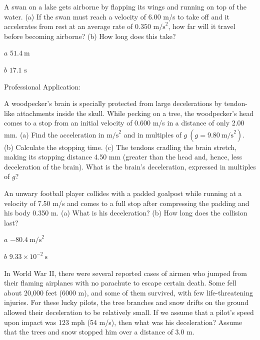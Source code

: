 \documentclass[
]{book}
\newenvironment{problems-exercises}{}{}
\newenvironment{tinysection}{}{}
\begin{document}
\begin{problems-exercises}
\hypertarget{fs-id1164906453058}{}
\leavevmode\hypertarget{fs-id1164906453061}{}%
A swan on a lake gets airborne by flapping its wings and running on top
of the water. (a) If the swan must reach a velocity of 6.00 m/s to take
off and it accelerates from rest at an average rate of
\({0\text{.}\text{350\ m/s}^{2}}{}\), how far will it travel before
becoming airborne? (b) How long does this take?

\leavevmode\hypertarget{fs-id1164906478379}{}%
\(a\) \({51\text{.}4\ \text{m}}{}\)

\(b\) \({\text{17}\text{.}\text{1\ s}}{}\)

\hypertarget{fs-id1164906459326}{}
\hypertarget{fs-id1164906459329}{}
\begin{tinysection}

{Professional Application:}

\end{tinysection}

A woodpecker's brain is specially protected from large decelerations by
tendon-like attachments inside the skull. While pecking on a tree, the
woodpecker's head comes to a stop from an initial velocity of 0.600 m/s
in a distance of only 2.00 mm. (a) Find the acceleration in
\(\text{m/s}^{2}{}\)\textsuperscript{} and in multiples of
\({g\ \left( {{g = 9}\text{.}\text{80}\ \text{m/s}^{2}} \right)}{}\). (b)
Calculate the stopping time. (c) The tendons cradling the brain stretch,
making its stopping distance 4.50 mm (greater than the head and, hence,
less deceleration of the brain). What is the brain's deceleration,
expressed in multiples of \(g\)?

\hypertarget{fs-id1164906466373}{}
\leavevmode\hypertarget{fs-id1164906466376}{}%
An unwary football player collides with a padded goalpost while running
at a velocity of 7.50 m/s and comes to a full stop after compressing the
padding and his body 0.350 m. (a) What is his deceleration? (b) How long
does the collision last?

\leavevmode\hypertarget{fs-id1164906466801}{}%
\(a\) \({{- \text{80}}\text{.}4\ \text{m/s}^{2}}{}\)

\(b\) \({9\text{.}{\text{33} \times \text{10}^{- 2}\ }\text{s}}{}\)

\hypertarget{fs-id1164906495926}{}
\leavevmode\hypertarget{fs-id1164906495929}{}%
In World War II, there were several reported cases of airmen who jumped
from their flaming airplanes with no parachute to escape certain death.
Some fell about 20,000 feet (6000 m), and some of them survived, with
few life-threatening injuries. For these lucky pilots, the tree branches
and snow drifts on the ground allowed their deceleration to be
relatively small. If we assume that a pilot's speed upon impact was 123
mph (54 m/s), then what was his deceleration? Assume that the trees and
snow stopped him over a distance of 3.0 m.


\end{problems-exercises}
\end{document}
